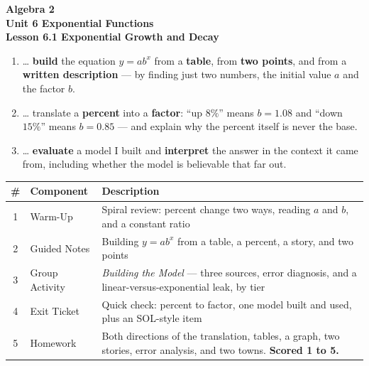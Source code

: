 \documentclass[10pt]{article}
\begin{document}
\vspace{-0.8in}

\begin{center}
  {\color{white}\textbf{\LARGE Algebra 2}}\\[4pt]
  {\color{forestmid}\large\textbf{Unit 6 \quad Exponential Functions}}\\[6pt]
  {\color{white}\textbf{\large Lesson 6.1 \quad Exponential Growth and Decay}}
\end{center}

\vspace{0.22in}
\namedateperiod
\vspace{0.18in}

\begin{learningtargetbox}
\small
\begin{enumerate}[leftmargin=1.5em, itemsep=5pt]
  \item \ldots{} \textbf{build} the equation $y=ab^{x}$ from a \textbf{table}, from \textbf{two points}, and from a \textbf{written description} --- by finding just two numbers, the initial value $a$ and the factor $b$.
  \item \ldots{} translate a \textbf{percent} into a \textbf{factor}: ``up $8\%$'' means $b=1.08$ and ``down $15\%$'' means $b=0.85$ --- and explain why the percent itself is never the base.
  \item \ldots{} \textbf{evaluate} a model I built and \textbf{interpret} the answer in the context it came from, including whether the model is believable that far out.
\end{enumerate}
\end{learningtargetbox}

\vspace{0.14in}

\begin{tocbox}
\small
\renewcommand{\arraystretch}{1.5}
\begin{tabularx}{\linewidth}{@{} c l X @{}}
\rowcolor{forestbg}
\textbf{\#} & \textbf{Component} & \textbf{Description} \\
\midrule
1 & Warm-Up        & Spiral review: percent change two ways, reading $a$ and $b$, and a constant ratio \\
2 & Guided Notes   & Building $y=ab^{x}$ from a table, a percent, a story, and two points \\
3 & Group Activity & \emph{Building the Model} --- three sources, error diagnosis, and a linear-versus-exponential leak, by tier \\
4 & Exit Ticket    & Quick check: percent to factor, one model built and used, plus an SOL-style item \\
5 & Homework       & Both directions of the translation, tables, a graph, two stories, error analysis, and two towns. \textbf{Scored 1 to 5.} \\
\end{tabularx}
\end{tocbox}
\end{document}
